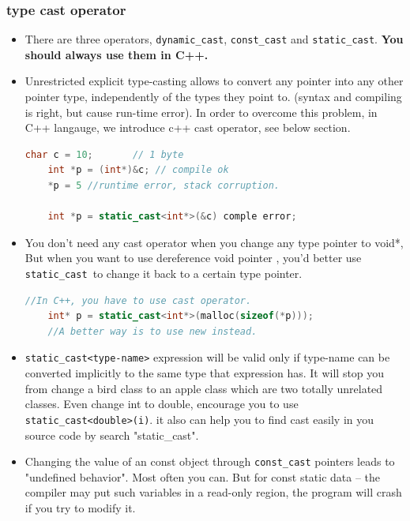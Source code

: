 \documentclass[a4paper,11pt,twoside]{book}
\begin{document}
\subsubsection{type cast operator}
\begin{itemize}
	\item There are three operators, \texttt{dynamic\_cast}, \texttt{const\_cast} and \texttt{static\_cast}. \textbf{You should always use them in C++.}
	
	\item Unrestricted explicit type-casting allows to convert any pointer into any other pointer type, independently of the types they point to.  (syntax and compiling is right, but cause run-time error). In order to overcome this problem,  in C++ langauge, we introduce c++ cast operator, see below section.
	\begin{lstlisting}[frame=single, language=c++]
	char c = 10;       // 1 byte
	int *p = (int*)&c; // compile ok
	*p = 5 //runtime error, stack corruption.
	
	int *p = static_cast<int*>(&c) comple error;
	\end{lstlisting}
	
	\item You don't need any cast operator when you change any type pointer to void*, But when you want to use dereference void pointer , you'd better use \texttt{static\_cast }to change it back to a certain type pointer.
	\begin{lstlisting}[frame=single, language=c++]
	//In C++, you have to use cast operator.
	int* p = static_cast<int*>(malloc(sizeof(*p)));
	//A better way is to use new instead.
	\end{lstlisting}
	
	\item    \texttt{static\_cast<type-name>} expression will be valid only if type-name can be converted implicitly to the same type that expression has.  It will stop you from change a bird class to an apple class which  are two totally unrelated classes.  Even change int to double, encourage you to use \texttt{static\_cast<double>(i)}.  it also can help you to find cast easily in you source code by search "static\_cast".
	
	\item Changing the value of an const object through \texttt{const\_cast} pointers leads to  "undefined behavior". Most often you can. But for const static data -- the compiler may put such variables in a read-only region, the program will crash if you try to modify it.
	

\end{itemize}
\end{document}
